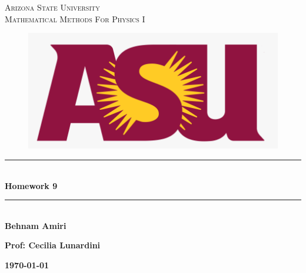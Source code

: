 \documentclass[fleqn]{article}
\begin{document}
  \begin{titlepage}

    \newcommand{\HRule}{\rule{\linewidth}{0.5mm}} %

    \center %
    


    \textsc{\LARGE Arizona State University}\\[1.5cm] %

    \textsc{\LARGE Mathematical Methods For Physics I }\\[1.5cm] %


    \begin{figure}
      \includegraphics[width=\linewidth]{asu.png}
    \end{figure}


    \HRule \\[0.4cm]
    { \huge \bfseries Homework 9}\\[0.4cm] 
    \HRule \\[1.5cm]
    
    \textbf{Behnam Amiri}

    \bigbreak

    \textbf{Prof: Cecilia Lunardini}

    \bigbreak


    \textbf{{\large \today}\\[2cm]}

    \vfill %

  \end{titlepage}
\end{document}
